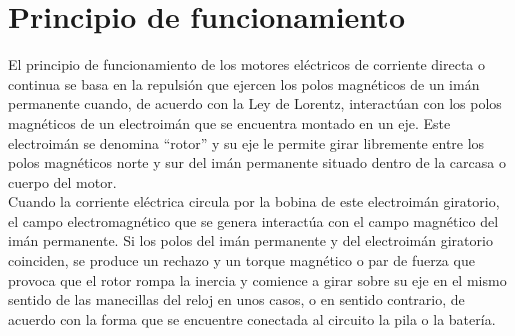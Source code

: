\documentclass[12pt,a4paper]{article}
\begin{document}
\section{Principio de funcionamiento}
El principio de funcionamiento de los motores eléctricos de corriente directa o continua se basa en la repulsión que ejercen los polos magnéticos de un imán permanente cuando, de acuerdo con la Ley de Lorentz, interactúan con los polos magnéticos de un electroimán que se encuentra montado en un eje. Este electroimán se denomina “rotor” y su eje le permite girar libremente entre los polos magnéticos norte y sur del imán permanente situado dentro de la carcasa o cuerpo del motor.\\
Cuando la corriente eléctrica circula por la bobina de este electroimán giratorio, el campo electromagnético que se genera interactúa con el campo magnético del imán permanente. Si los polos del imán permanente y del electroimán giratorio coinciden, se produce un rechazo y un torque magnético o par de fuerza que provoca que el rotor rompa la inercia y comience a girar sobre su eje en el mismo sentido de las manecillas del reloj en unos casos, o en sentido contrario, de acuerdo con la forma que se encuentre conectada al circuito la pila o la batería.
\end{document}
